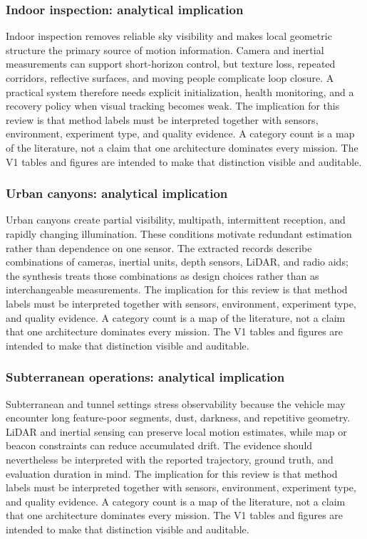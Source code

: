 \documentclass[
  journal,
  10pt]{IEEEtran}
\begin{document}
\subsubsection{Indoor inspection: analytical
implication}\label{indoor-inspection-analytical-implication-1}

Indoor inspection removes reliable sky visibility and makes local
geometric structure the primary source of motion information. Camera and
inertial measurements can support short-horizon control, but texture
loss, repeated corridors, reflective surfaces, and moving people
complicate loop closure. A practical system therefore needs explicit
initialization, health monitoring, and a recovery policy when visual
tracking becomes weak. The implication for this review is that method
labels must be interpreted together with sensors, environment,
experiment type, and quality evidence. A category count is a map of the
literature, not a claim that one architecture dominates every mission.
The V1 tables and figures are intended to make that distinction visible
and auditable.

\subsubsection{Urban canyons: analytical
implication}\label{urban-canyons-analytical-implication-1}

Urban canyons create partial visibility, multipath, intermittent
reception, and rapidly changing illumination. These conditions motivate
redundant estimation rather than dependence on one sensor. The extracted
records describe combinations of cameras, inertial units, depth sensors,
LiDAR, and radio aids; the synthesis treats those combinations as design
choices rather than as interchangeable measurements. The implication for
this review is that method labels must be interpreted together with
sensors, environment, experiment type, and quality evidence. A category
count is a map of the literature, not a claim that one architecture
dominates every mission. The V1 tables and figures are intended to make
that distinction visible and auditable.

\subsubsection{Subterranean operations: analytical
implication}\label{subterranean-operations-analytical-implication-1}

Subterranean and tunnel settings stress observability because the
vehicle may encounter long feature-poor segments, dust, darkness, and
repetitive geometry. LiDAR and inertial sensing can preserve local
motion estimates, while map or beacon constraints can reduce accumulated
drift. The evidence should nevertheless be interpreted with the reported
trajectory, ground truth, and evaluation duration in mind. The
implication for this review is that method labels must be interpreted
together with sensors, environment, experiment type, and quality
evidence. A category count is a map of the literature, not a claim that
one architecture dominates every mission. The V1 tables and figures are
intended to make that distinction visible and auditable.
\end{document}
